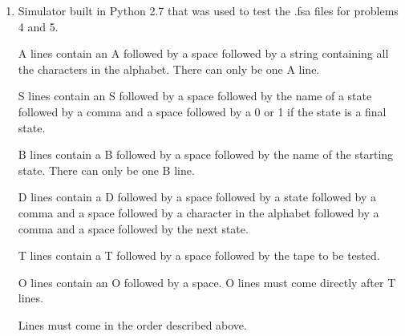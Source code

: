 \documentclass[a4paper]{article}
\begin{document}
\begin{enumerate}
\begin{tabular}{ |c|c|c| }
    \end{tabular}


    \vspace{2cm}

    
    \item Simulator built in Python 2.7 that was used to test the .fsa files for problems 4 and 5. 
    
    A lines contain an A followed by a space followed by a string containing all the 
    characters in the alphabet. There can only be one A line.

    S lines contain an S followed by a space followed by the name of a state followed 
    by a comma and a space followed by a 0 or 1 if the state is a final state.

    B lines contain a B followed by a space followed by the name of the starting state. 
    There can only be one B line.

    D lines contain a D followed by a space followed by a state followed by a comma and
    a space followed by a character in the alphabet followed by a comma and a space
    followed by the next state.

    T lines contain a T followed by a space followed by the tape to be tested.

    O lines contain an O followed by a space. O lines must come directly after T lines.

    Lines must come in the order described above.


\end{enumerate}
\end{document}
